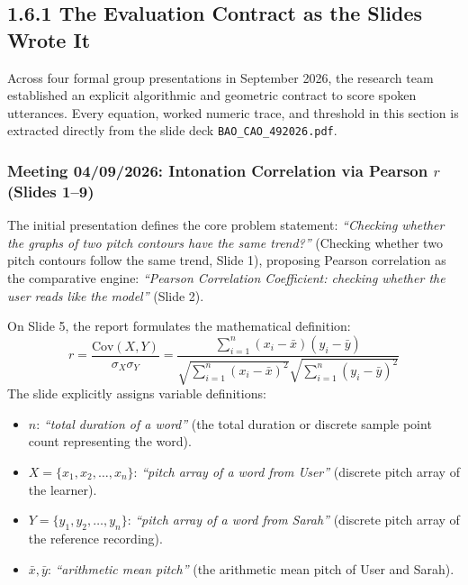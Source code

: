 \documentclass[11pt,a4paper]{article}
\begin{document}
\subsection*{1.6.1 The Evaluation Contract as the Slides Wrote It}

Across four formal group presentations in September 2026, the research team established an explicit algorithmic and geometric contract to score spoken utterances. Every equation, worked numeric trace, and threshold in this section is extracted directly from the slide deck \texttt{BAO\_CAO\_492026.pdf}.

\subsubsection*{Meeting 04/09/2026: Intonation Correlation via Pearson $r$ (Slides 1--9)}

The initial presentation defines the core problem statement: \textit{``Checking whether the graphs of two pitch contours have the same trend?''} (Checking whether two pitch contours follow the same trend, Slide 1), proposing Pearson correlation as the comparative engine: \textit{``Pearson Correlation Coefficient: checking whether the user reads like the model''} (Slide 2).

On Slide 5, the report formulates the mathematical definition:
\begin{equation}
r = \frac{\text{Cov}(X, Y)}{\sigma_X \sigma_Y} = \frac{\sum_{i=1}^n (x_i - \bar{x})(y_i - \bar{y})}{\sqrt{\sum_{i=1}^n (x_i - \bar{x})^2}\sqrt{\sum_{i=1}^n (y_i - \bar{y})^2}}
\label{eq:slide_pearson}
\end{equation}
The slide explicitly assigns variable definitions:
\begin{itemize}
    \item $n$: \textit{``total duration of a word''} (the total duration or discrete sample point count representing the word).
    \item $X = \{x_1, x_2, \dots, x_n\}$: \textit{``pitch array of a word from User''} (discrete pitch array of the learner).
    \item $Y = \{y_1, y_2, \dots, y_n\}$: \textit{``pitch array of a word from Sarah''} (discrete pitch array of the reference recording).
    \item $\bar{x}, \bar{y}$: \textit{``arithmetic mean pitch''} (the arithmetic mean pitch of User and Sarah).
\end{itemize}
\end{document}
